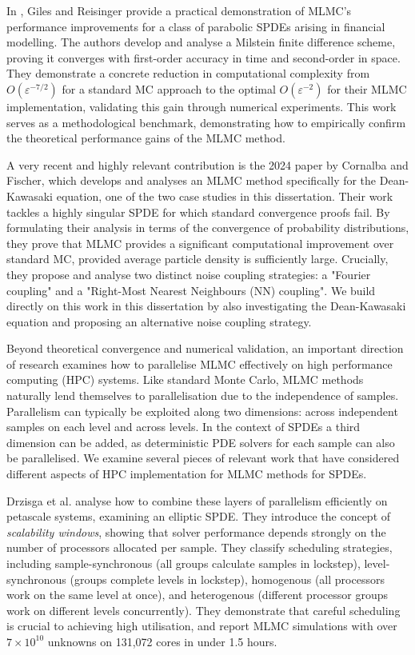 In \cite{giles2012stochastic}, Giles and Reisinger provide a practical demonstration of 
MLMC's performance improvements for a class of parabolic SPDEs arising in financial modelling. 
The authors develop and analyse a Milstein finite difference scheme, proving it converges with 
first-order accuracy in time and second-order in space. They demonstrate a concrete reduction
in computational complexity from $O(\varepsilon^{-7/2})$ for a standard MC approach to the optimal 
$O(\varepsilon^{-2})$ for their MLMC implementation, validating this gain through 
numerical experiments. This work serves as a methodological benchmark, demonstrating how to 
empirically confirm the theoretical performance gains of the MLMC method.

A very recent and highly relevant contribution is the 2024 paper by 
Cornalba and Fischer, which 
develops and analyses an MLMC method specifically for the Dean-Kawasaki equation, 
one of the two case studies in this dissertation. Their work tackles a highly singular SPDE 
for which standard convergence proofs fail. By formulating their analysis in terms 
of the convergence of probability distributions, they prove that MLMC provides a 
significant computational improvement over standard MC, provided average 
particle density is sufficiently large. Crucially, they propose and 
analyse two distinct noise coupling strategies:
a "Fourier coupling" and a "Right-Most Nearest Neighbours (NN) coupling". We build directly
on this work in this dissertation by also investigating the Dean-Kawasaki equation and proposing 
an alternative noise coupling strategy.


Beyond theoretical convergence and numerical validation, an important 
direction of research examines how to parallelise MLMC effectively on 
high performance computing (HPC) systems. Like standard Monte Carlo, 
MLMC methods naturally lend themselves to parallelisation due to the 
independence of samples. Parallelism can typically be exploited along 
two dimensions: across independent samples on each level and across levels. 
In the context of SPDEs a third dimension can be added, as deterministic 
PDE solvers for each sample can also be parallelised. We examine several 
pieces of relevant work that have considered different aspects of 
HPC implementation for MLMC methods for SPDEs.

Drzisga et al.  \cite{drzisga2017scheduling} analyse how to combine 
these layers of parallelism efficiently on petascale systems, examining 
an elliptic SPDE. They 
introduce the concept of \textit{scalability windows}, showing 
that solver performance depends strongly on the number of 
processors allocated per sample. They classify 
scheduling strategies, including sample-synchronous (all groups 
calculate samples in lockstep), level-synchronous (groups complete 
levels in lockstep), homogenous (all processors work on the 
same level at once), and heterogenous (different processor 
groups work on different levels concurrently). They demonstrate that 
careful scheduling is crucial to achieving high utilisation, and report 
MLMC simulations with over $7 \times 10^{10}$ unknowns 
on 131,072 cores in under 1.5 hours.

